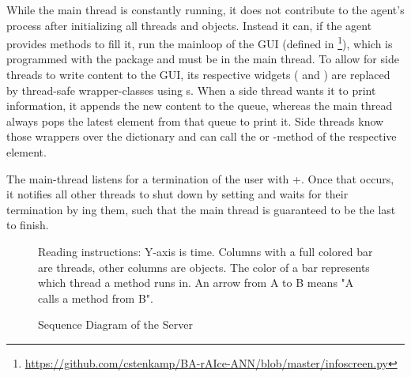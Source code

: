 While the main thread is constantly running, it does not contribute to the agent's process after initializing all threads and objects. Instead it can, if the agent provides methods to fill it, run the mainloop of the GUI (defined in \footnote{\url{https://github.com/cstenkamp/BA-rAIce-ANN/blob/master/infoscreen.py}}), which is programmed with the package  and must be in the main thread. To allow for side threads to write content to the GUI, its respective widgets ( and ) are replaced by thread-safe wrapper-classes using s. When a side thread wants it to print information, it appends the new content to the queue, whereas the main thread always pops the latest element from that queue to print it. Side threads know those wrappers over the dictionary  and can call the  or -method of the respective element.

The main-thread listens for a termination of the user with +. Once that occurs, it notifies all other threads to shut down by setting  and waits for their termination by ing them, such that the main thread is guaranteed to be the last to finish.


\begin{figure}[h!]
	\centering
	\resizebox{1.01\textwidth}{!}{
		
	}
	\caption{Sequence Diagram of the Server}
	\label{fig:sequenceserver}
	\medskip
	\scriptsize
	Reading instructions: Y-axis is time. Columns with a full colored bar are threads, other columns are objects. The color of a bar represents which thread a method runs in. An arrow from A to B means "A calls a method from B". %
\end{figure}

